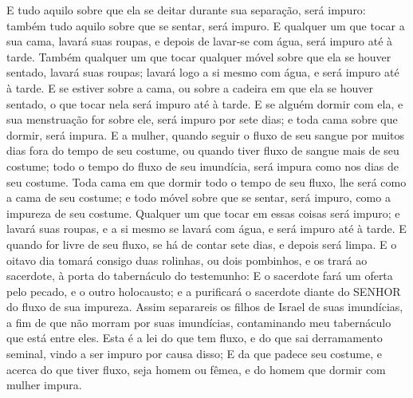 {E tudo aquilo sobre que ela se deitar durante sua separação, será impuro: também tudo aquilo sobre que se sentar, será impuro.
E qualquer um que tocar a sua cama, lavará suas roupas, e depois de lavar-se com água, será impuro até à tarde.
Também qualquer um que tocar qualquer móvel sobre que ela se houver sentado, lavará suas roupas; lavará logo a si mesmo com água, e será impuro até à tarde.
E se estiver sobre a cama, ou sobre a cadeira em que ela se houver sentado, o que tocar nela será impuro até à tarde.
E se alguém dormir com ela, e sua menstruação for sobre ele, será impuro por sete dias; e toda cama sobre que dormir, será impura.
E a mulher, quando seguir o fluxo de seu sangue por muitos dias fora do tempo de seu costume, ou quando tiver fluxo de sangue mais de seu costume; todo o tempo do fluxo de seu imundícia, será impura como nos dias de seu costume.
Toda cama em que dormir todo o tempo de seu fluxo, lhe será como a cama de seu costume; e todo móvel sobre que se sentar, será impuro, como a impureza de seu costume.
Qualquer um que tocar em essas coisas será impuro; e lavará suas roupas, e a si mesmo se lavará com água, e será impuro até à tarde.
E quando for livre de seu fluxo, se há de contar sete dias, e depois será limpa.
E o oitavo dia tomará consigo duas rolinhas, ou dois pombinhos, e os trará ao sacerdote, à porta do tabernáculo do testemunho:
E o sacerdote fará um oferta pelo pecado, e o outro holocausto; e a purificará o sacerdote diante do SENHOR do fluxo de sua impureza.
Assim separareis os filhos de Israel de suas imundícias, a fim de que não morram por suas imundícias, contaminando meu tabernáculo que está entre eles.
Esta é a lei do que tem fluxo, e do que sai derramamento seminal, vindo a ser impuro por causa disso;
E da que padece seu costume, e acerca do que tiver fluxo, seja homem ou fêmea, e do homem que dormir com mulher impura.

}
